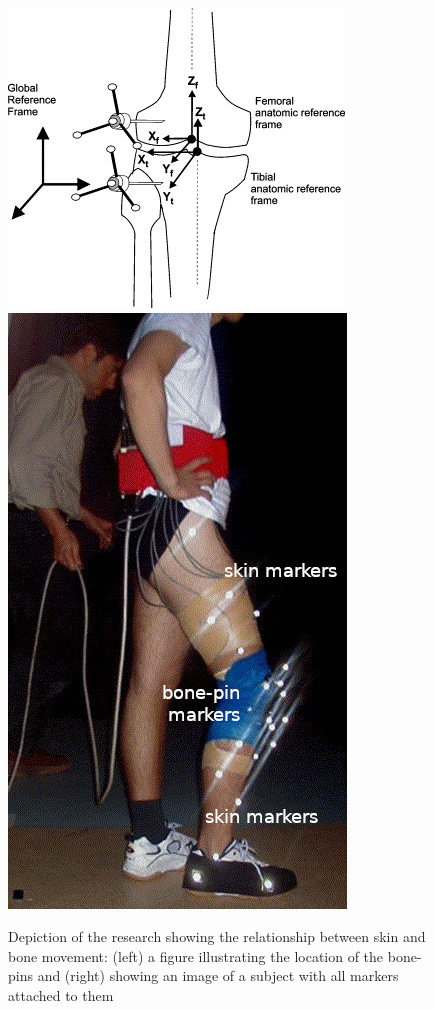 \begin{figure}[ht!]
    \centering
    \includegraphics[width=0.6\linewidth]{Figures/Background/SkinMovementResearch_Diagram.jpg}
    \includegraphics[width=0.3\linewidth]{Figures/Background/SkinMovementResearch_ImageMarked.jpg}
    \caption{Depiction of the research showing the relationship between skin and bone movement: (left) a figure illustrating the location of the bone-pins and (right) showing an image of a subject with all markers attached to them \cite{SkinMovementKneeKin}}
    \label{fig:SkinBoneRelationshipStudy}
\end{figure}

